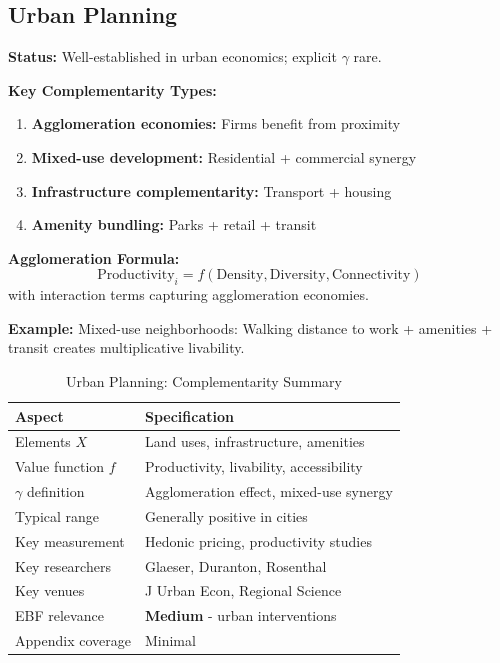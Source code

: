 \subsection{Urban Planning}
\label{sec:urban}

\begin{tcolorbox}[colback=brown!5!white,colframe=brown!75!black,title=\textbf{Urban Planning: Agglomeration and Land Use Complementarity}]

\textbf{Status:} Well-established in urban economics; explicit $\gamma$ rare.

\textbf{Key Complementarity Types:}
\begin{enumerate}[noitemsep]
    \item \textbf{Agglomeration economies:} Firms benefit from proximity
    \item \textbf{Mixed-use development:} Residential + commercial synergy
    \item \textbf{Infrastructure complementarity:} Transport + housing
    \item \textbf{Amenity bundling:} Parks + retail + transit
\end{enumerate}

\textbf{Agglomeration Formula:}
\begin{equation}
\text{Productivity}_i = f(\text{Density}, \text{Diversity}, \text{Connectivity})
\end{equation}
with interaction terms capturing agglomeration economies.

\textbf{Example:}
Mixed-use neighborhoods: Walking distance to work + amenities + transit creates multiplicative livability.

\end{tcolorbox}

\begin{table}[h]
\centering
\caption{Urban Planning: Complementarity Summary}
\label{tab:urban-summary}
\renewcommand{\arraystretch}{1.3}
\small
\begin{tabular}{@{}ll@{}}
\toprule
\textbf{Aspect} & \textbf{Specification} \\
\midrule
Elements $X$ & Land uses, infrastructure, amenities \\
Value function $f$ & Productivity, livability, accessibility \\
$\gamma$ definition & Agglomeration effect, mixed-use synergy \\
Typical range & Generally positive in cities \\
Key measurement & Hedonic pricing, productivity studies \\
Key researchers & Glaeser, Duranton, Rosenthal \\
Key venues & J Urban Econ, Regional Science \\
EBF relevance & \textbf{Medium} - urban interventions \\
Appendix coverage & Minimal \\
\bottomrule
\end{tabular}
\end{table}

